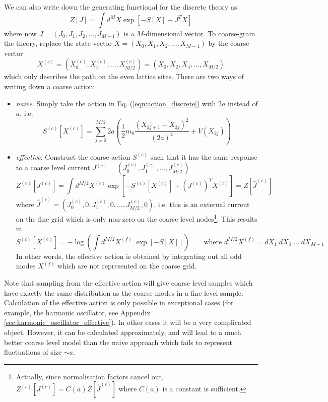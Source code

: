 \documentclass[11pt]{article}
\renewcommand{\vec}[1]{{#1}}
\begin{document}
We can also write down the generating functional for the discrete theory as
\begin{equation}
  Z[\vec{J}] = \int d^{M}\vec{X} \exp\left[-S[\vec{X}]+\vec{J}^T\vec{X}\right]
\end{equation}
where now $J=(J_0,J_1,J_2,\dots,J_{M-1})$ is a $M$-dimensional vector.
To coarse-grain the theory, replace the state vector $\vec{X}=(X_0,X_1,X_2,\dots,X_{M-1})$ by the coarse vector
\begin{equation}
  \vec{X}^{(c)}=(X_0^{(c)},X_1^{(c)},\dots,X_{M/2}^{(c)}) = (X_0,X_2,X_4,\dots,X_{M/2})
\end{equation}
which only describes the path on the even lattice sites. 
There are two ways of writing down a coarse action:
\begin{itemize}
\item \textit{naive}. Simply take the action in Eq. (\ref{eqn:action_discrete}) with $2a$ instead of $a$, i.e.
  \begin{equation}
    S^{(c)}[\vec{X}^{(c)}] = \sum_{j=0}^{M/2} 2a \left(\frac{1}{2}m_0\frac{(X_{2j+1}-X_{2j})^2}{(2a)^2}+V(X_{2j})\right)
    \end{equation}
\item \textit{effective}. Construct the coarse action $S^{(c)}$ such that it has the same response to a coarse level current $J^{(c)}=(J_0^{(c)},J_1^{(c)},\dots,J_{M/2}^{(c)})$
  \begin{equation}
    Z^{(c)}[\vec{J}^{(c)}] = \int d^{M/2}\vec{X}^{(c)} \exp\left[-S^{(c)}[\vec{X}^{(c)}]+(\vec{J}^{(c)})^T\vec{X}^{(c)}\right] = Z[\hat{\vec{J}}^{(c)}]
  \end{equation}
where $\hat{J}^{(c)}=(J_0^{(c)},0,J_1^{(c)},0,\dots,J_{M/2}^{(c)},0)$, i.e. this is an external current on the fine grid which is only non-zero on the coarse level nodes\footnote{Actually, since normalisation factors cancel out, $Z^{(c)}[J^{(c)}]=C(a) Z[\hat{J}^{(c)}]$ where $C(a)$ is a constant is sufficient.}.
  This results in
  \begin{equation}
    S^{(c)}[\vec{X}^{(c)}] = -\log \left(\int d^{M/2}\vec{X}^{(f)}\; \exp\left[-S[\vec{X}]\right]\right)\qquad\text{where $d^{M/2}\vec{X}^{(f)}=dX_1\;dX_3\;\dots\;dX_{M-1}$}
  \end{equation}
  In other words, the effective action is obtained by integrating out all odd modes $X^{(f)}$ which are not represented on the coarse grid.
\end{itemize}
Note that sampling from the effective action will give coarse level samples which have exactly the same distribution as the coarse modes in a fine level sample.
Calculation of the effective action is only possible in exceptional cases (for example, the harmonic oscillator, see Appendix \ref{sec:harmonic_oscillator_effective}). In other cases it will be a very complicated object. However, it can be calculated approximately, and will lead to a much better coarse level model than the naive approach which fails to represent fluctuations of size $\sim a$.
\end{document}
